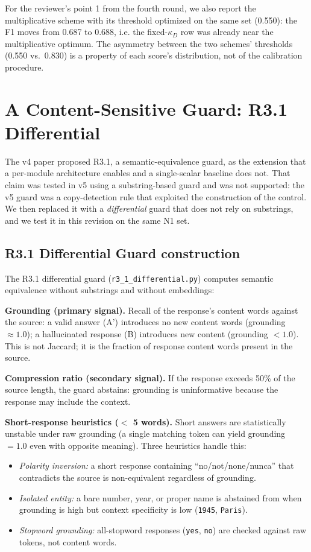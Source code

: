 \documentclass[11pt,a4paper]{article}
\begin{document}
For the reviewer's point 1 from the fourth round, we also report the multiplicative scheme with its threshold optimized on the same set (0.550): the F1 moves from 0.687 to 0.688, i.e. the fixed-$\kappa_D$ row was already near the multiplicative optimum. The asymmetry between the two schemes' thresholds (0.550 vs.\ 0.830) is a property of each score's distribution, not of the calibration procedure.

\section{A Content-Sensitive Guard: R3.1 Differential}
\label{sec:r31-guard}

The v4 paper proposed R3.1, a semantic-equivalence guard, as the extension that a per-module architecture enables and a single-scalar baseline does not. That claim was tested in v5 using a substring-based guard and was not supported: the v5 guard was a copy-detection rule that exploited the construction of the control. We then replaced it with a \emph{differential} guard that does not rely on substrings, and we test it in this revision on the same N1 set.

\subsection{R3.1 Differential Guard construction}
The R3.1 differential guard (\texttt{r3\_1\_differential.py}) computes semantic equivalence without substrings and without embeddings:

\textbf{Grounding (primary signal).} Recall of the response's content words against the source: a valid answer (A') introduces no new content words (grounding $\approx 1.0$); a hallucinated response (B) introduces new content (grounding $< 1.0$). This is not Jaccard; it is the fraction of response content words present in the source.

\textbf{Compression ratio (secondary signal).} If the response exceeds 50\% of the source length, the guard abstains: grounding is uninformative because the response may include the context.

\textbf{Short-response heuristics ($<$ 5 words).} Short answers are statistically unstable under raw grounding (a single matching token can yield grounding $= 1.0$ even with opposite meaning). Three heuristics handle this:
\begin{itemize}
    \item \emph{Polarity inversion:} a short response containing ``no/not/none/nunca'' that contradicts the source is non-equivalent regardless of grounding.
    \item \emph{Isolated entity:} a bare number, year, or proper name is abstained from when grounding is high but context specificity is low (\texttt{1945}, \texttt{Paris}).
    \item \emph{Stopword grounding:} all-stopword responses (\texttt{yes}, \texttt{no}) are checked against raw tokens, not content words.
\end{itemize}
\end{document}
